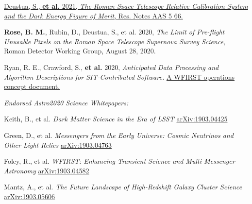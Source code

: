 \documentclass[margin]{res}
\begin{document}
\begin{resume}
\hangindent=15pt 
\href{iopscience.iop.org/article/10.3847/2515-5172/abf1fb}{Deustua, S., \textbf{et al.} 2021, {\sl The Roman Space Telescope Relative Calibration System and the Dark Energy Figure of Merit}, Res. Notes AAS 5 66.}
\vspace{-12pt}

\hangindent=15pt 
\textbf{Rose, B. M.}, Rubin, D., Deustua, S., et al. 2020, {\sl The Limit of Pre-flight Unusable Pixels on the Roman Space Telescope Supernova Survey Science}, Roman Detector Working Group, August 28, 2020.
\vspace{-12pt}

\hangindent=15pt 
Ryan, R. E., Crawford, S., \textbf{et al.} 2020, {\sl Anticipated Data Processing and Algorithm Descriptions for SIT-Contributed Software.} \href{https://outerspace.stsci.edu/display/FWG/Anticipated+Data+Processing+and+Algorithm+Descriptions+for+SIT-Contributed+Software}{A WFIRST operations concept document.}
\vspace{-12pt}


\textit{Endorsed Astro2020 Science Whitepapers:}

\vspace{-12pt}\hspace{15pt}\hangindent=30pt 
Keith, B., et al. \textit{Dark Matter Science in the Era of LSST}
\href{https://ui.adsabs.harvard.edu/abs/2019arXiv190304425B/abstract}{arXiv:1903.04425}

\vspace{-12pt}\hspace{15pt}\hangindent=30pt 
Green, D., et al. \textit{Messengers from the Early Universe: Cosmic Neutrinos and Other Light Relics}
\href{https://ui.adsabs.harvard.edu/abs/2019arXiv190304763G/abstract}{arXiv:1903.04763}

\vspace{-12pt}\hspace{15pt}\hangindent=30pt 
Foley, R., et al. \textit{WFIRST: Enhancing Transient Science and Multi-Messenger Astronomy}
\href{https://ui.adsabs.harvard.edu/abs/2019arXiv190304582F/abstract}{arXiv:1903.04582}

\vspace{-12pt}\hspace{15pt}\hangindent=30pt
Mantz, A., et al. \textit{The Future Landscape of High-Redshift Galaxy Cluster Science}\\
\href{https://ui.adsabs.harvard.edu/abs/2019BAAS...51c.279M/abstract}{arXiv:1903.05606}


\end{resume}
\end{document}
